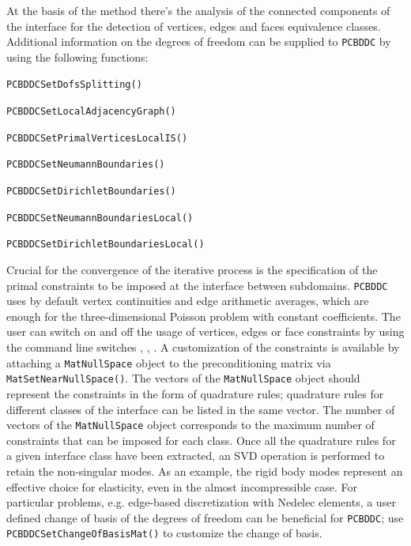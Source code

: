 At the basis of the method there's the analysis of the connected components of the interface for the detection of vertices,
edges and faces equivalence classes. Additional information on the degrees of freedom can be supplied to \lstinline{PCBDDC} by using
the following functions: 
\begin{tightitemize}
\item \lstinline{PCBDDCSetDofsSplitting()}
\item \lstinline{PCBDDCSetLocalAdjacencyGraph()}
\item \lstinline{PCBDDCSetPrimalVerticesLocalIS()}
\item \lstinline{PCBDDCSetNeumannBoundaries()}
\item \lstinline{PCBDDCSetDirichletBoundaries()}
\item \lstinline{PCBDDCSetNeumannBoundariesLocal()}
\item \lstinline{PCBDDCSetDirichletBoundariesLocal()}
\end{tightitemize}

Crucial for the convergence of the iterative process is the specification of the primal constraints to be imposed at the interface
between subdomains. \lstinline{PCBDDC} uses by default vertex continuities and edge arithmetic averages, which are enough for the three-dimensional
Poisson problem with constant coefficients. The user can switch on and off the usage of vertices, edges or face constraints by using the command line
switches , , . A customization of the constraints is available
by attaching a \lstinline{MatNullSpace} object to
the preconditioning matrix via \lstinline{MatSetNearNullSpace()}. The vectors of the \lstinline{MatNullSpace} object should represent the constraints
in the form of quadrature rules; quadrature rules for different classes of the interface can be listed in the same vector.
The number of vectors of the \lstinline{MatNullSpace} object corresponds to the maximum number of constraints that can be imposed for each class.
Once all the quadrature rules for a given interface class have been extracted, an SVD operation is performed to retain the non-singular modes.
As an example, the rigid body modes represent an effective choice for elasticity, even in the almost incompressible case. For particular problems,
e.g. edge-based discretization with Nedelec elements, a user defined change of basis of the degrees of
freedom can be beneficial for \lstinline{PCBDDC}; use \lstinline{PCBDDCSetChangeOfBasisMat()} to customize the change of basis.

